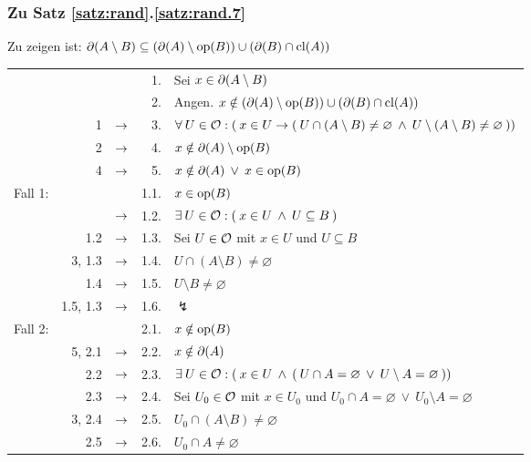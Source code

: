 \subsubsection{Zu Satz \ref{satz:rand}.\ref{satz:rand.7}}\label{anh:rand.7}
    Zu zeigen ist: $\partial(A \setminus B) \subseteq (\partial(A) \setminus \text{op}(B)) \cup (\partial(B) \cap \text{cl}(A))$

    \begin{longtable}{r r c r l}
        & & & 1. & Sei $x \in \partial(A \setminus B) $ \\
        & & & 2. & Angen. $x \notin (\partial(A) \setminus \text{op}(B)) \cup (\partial(B) \cap \text{cl}(A))$ \\
        & 1 & $\rightarrow$ & 3. & $\forall\: U \in \mathcal{O} : (\: x \in U \to (\: U \cap (A \setminus B) \neq \varnothing \:\land\: U \setminus (A \setminus B) \neq \varnothing \:))$ \\
        & 2 & $\rightarrow$ & 4. & $x \notin \partial(A) \setminus \text{op}(B)$ \\
        & 4 & $\rightarrow$ & 5. & $x \notin \partial(A) \:\lor\: x \in \text{op}(B)$ \\
        \hline
        Fall 1: & & & 1.1. & $x \in \text{op}(B)$ \\
        &  & $\rightarrow$ & 1.2. & $\exists\: U \in \mathcal{O} : (\: x \in U \:\land\: U \subseteq B \:)$ \\
        & 1.2 & $\rightarrow$ & 1.3. & Sei $U \in \mathcal{O}$ mit $x \in U$ und $U \subseteq B$  \\
        & 3, 1.3 & $\rightarrow$ & 1.4. & $U \cap (A \setminus B) \neq \varnothing$ \\
        & 1.4 & $\rightarrow$ & 1.5. & $U \setminus B \neq \varnothing$ \\
        & 1.5, 1.3 & $\rightarrow$ & 1.6. & $\lightning$ \\
        \hline
        Fall 2: & & & 2.1. & $x \notin \text{op}(B)$ \\
        & 5, 2.1 & $\rightarrow$ & 2.2. & $x \notin \partial(A)$ \\
        & 2.2 & $\rightarrow$ & 2.3. & $\exists\: U \in \mathcal{O} : (\: x \in U \:\land\: (\: U \cap A = \varnothing \:\lor\: U \setminus A = \varnothing \:))$ \\
        & 2.3 & $\rightarrow$ & 2.4. & Sei $U_0 \in \mathcal{O}$ mit $x \in U_0$ und $U_0 \cap A = \varnothing \:\lor\: U_0 \setminus A = \varnothing$ \\
        & 3, 2.4 & $\rightarrow$ & 2.5. & $U_0 \cap (A \setminus B) \neq \varnothing$ \\
        & 2.5 & $\rightarrow$ & 2.6. & $U_0 \cap A \neq \varnothing$ \\

\end{longtable}
